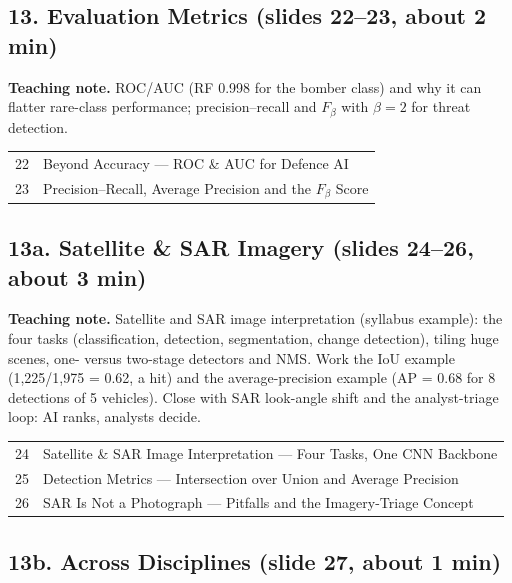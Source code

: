 \documentclass[11pt]{article}
\begin{document}
\subsection{13. Evaluation Metrics \normalfont\small\color{GreyN}(slides 22--23, about 2 min)}

\textbf{Teaching note.} ROC/AUC (RF 0.998 for the bomber class) and why it can flatter rare-class performance; precision--recall and $F_\beta$ with $\beta=2$ for threat detection.

\begin{center}\small\renewcommand{\arraystretch}{1.1}\begin{tabularx}{\textwidth}{@{}r X@{}}22 & Beyond Accuracy --- ROC \& AUC for Defence AI\\
23 & Precision--Recall, Average Precision and the $F_\beta$ Score\\\end{tabularx}\end{center}

\subsection{13a. Satellite \& SAR Imagery \normalfont\small\color{GreyN}(slides 24--26, about 3 min)}

\textbf{Teaching note.} Satellite and SAR image interpretation (syllabus example): the four tasks (classification, detection, segmentation, change detection), tiling huge scenes, one- versus two-stage detectors and NMS. Work the IoU example (1,225/1,975 = 0.62, a hit) and the average-precision example (AP = 0.68 for 8 detections of 5 vehicles). Close with SAR look-angle shift and the analyst-triage loop: AI ranks, analysts decide.

\begin{center}\small\renewcommand{\arraystretch}{1.1}\begin{tabularx}{\textwidth}{@{}r X@{}}24 & Satellite \& SAR Image Interpretation --- Four Tasks, One CNN Backbone\\
25 & Detection Metrics --- Intersection over Union and Average Precision\\
26 & SAR Is Not a Photograph --- Pitfalls and the Imagery-Triage Concept\\\end{tabularx}\end{center}

\subsection{13b. Across Disciplines \normalfont\small\color{GreyN}(slide 27, about 1 min)}
\end{document}
